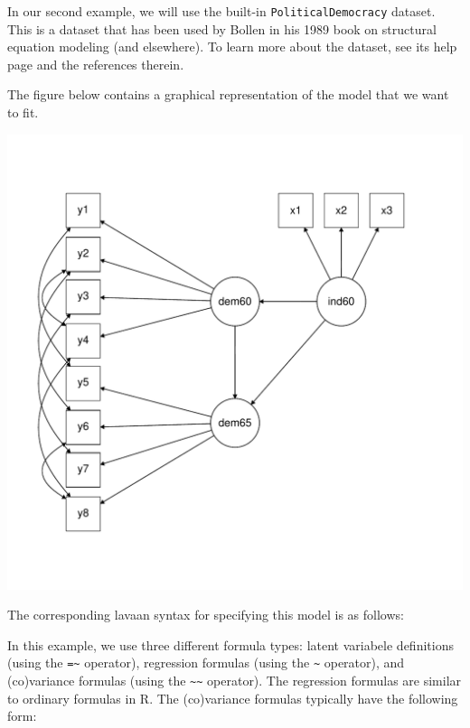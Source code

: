 In our second example, we will use the built-in
\texttt{PoliticalDemocracy} dataset. This is a dataset that has been
used by Bollen in his 1989 book on structural equation modeling (and
elsewhere). To learn more about the dataset, see its help page and the
references therein.

The figure below contains a graphical representation of the model that
we want to fit.

\includegraphics{figure/sem.pdf}

The corresponding lavaan syntax for specifying this model is as follows:

\begin{Shaded}
\begin{Highlighting}[]
\end{Highlighting}
\end{Shaded}

In this example, we use three different formula types: latent variabele
definitions (using the \texttt{=\textasciitilde{}} operator), regression
formulas (using the \texttt{\textasciitilde{}} operator), and
(co)variance formulas (using the
\texttt{\textasciitilde{}\textasciitilde{}} operator). The regression
formulas are similar to ordinary formulas in R. The (co)variance
formulas typically have the following form:

